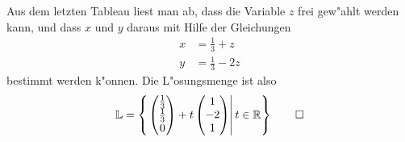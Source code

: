 \begin{loesung}
Aus dem letzten Tableau liest man ab, dass die Variable $z$ frei gew"ahlt
werden kann, und dass $x$ und $y$ daraus mit Hilfe der Gleichungen
\begin{align*}
x&=\frac13+z\\
y&=\frac13-2z
\end{align*}
bestimmt werden k"onnen.
Die L"osungsmenge ist also
\[
\mathbb L =\left\{\left.
\begin{pmatrix}\frac13\\\frac13\\0\end{pmatrix}
+
t\begin{pmatrix}1\\-2\\1\end{pmatrix}
\right| t\in\mathbb R
\right\}
\qedhere
\]
\end{loesung}

